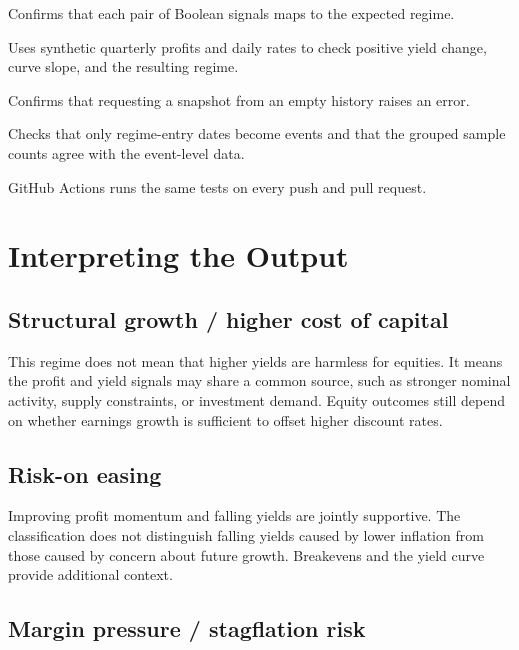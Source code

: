 \documentclass[11pt]{article}
\begin{document}
\begin{description}[style=nextline]
\item[Four regime combinations]
Confirms that each pair of Boolean signals maps to the expected regime.

\item[Signal calculations]
Uses synthetic quarterly profits and daily rates to check positive yield
change, curve slope, and the resulting regime.

\item[Empty input]
Confirms that requesting a snapshot from an empty history raises an error.

\item[Event dates and summaries]
Checks that only regime-entry dates become events and that the grouped sample
counts agree with the event-level data.
\end{description}

GitHub Actions runs the same tests on every push and pull request.

\section{Interpreting the Output}

\subsection{Structural growth / higher cost of capital}

This regime does not mean that higher yields are harmless for equities. It
means the profit and yield signals may share a common source, such as stronger
nominal activity, supply constraints, or investment demand. Equity outcomes
still depend on whether earnings growth is sufficient to offset higher
discount rates.

\subsection{Risk-on easing}

Improving profit momentum and falling yields are jointly supportive. The
classification does not distinguish falling yields caused by lower inflation
from those caused by concern about future growth. Breakevens and the yield
curve provide additional context.

\subsection{Margin pressure / stagflation risk}
\end{document}
